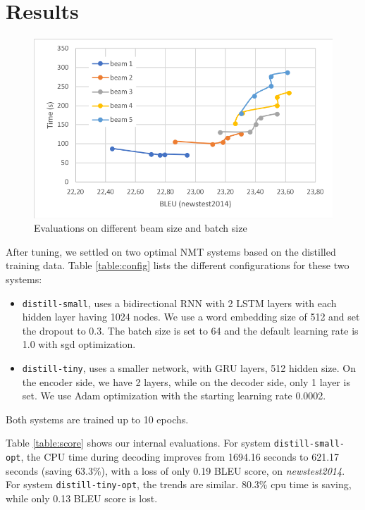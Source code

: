 \documentclass[11pt,a4paper]{article}
\begin{document}
\section{Results}

\begin{figure}
\includegraphics[width=\linewidth]{beambatch.png}
\caption{\small Evaluations on different beam size and batch size}
\label{fig:beam_batch_bleu}
\end{figure}

After tuning, we settled on two optimal NMT systems based on the
distilled training data. Table \ref{table:config}
lists the different configurations for these two systems:

\begin{itemize}
\item {\tt distill-small}, uses a bidirectional RNN with 2 LSTM layers with each hidden layer having 1024 nodes.
We use a word embedding size of 512 and set the dropout to 0.3.
The batch size is set to 64 and the default learning rate is 1.0 with sgd optimization.
\item {\tt distill-tiny}, uses  a smaller network, with GRU layers, 512 hidden size.
On the encoder side, we have 2 layers, while on the decoder side, only 1 layer is set.
We use Adam optimization with the starting learning rate 0.0002.
\end{itemize}
Both systems are trained up to 10 epochs.

Table \ref{table:score} shows our internal evaluations.
For system {\tt distill-small-opt}, the CPU time during decoding improves from 1694.16 seconds to 621.17 seconds (saving 63.3\%), with a loss of only 0.19 BLEU score, on {\it newstest2014}.
For system {\tt distill-tiny-opt}, the trends are similar.
80.3\% cpu time is saving, while only 0.13 BLEU score is lost.
\end{document}
